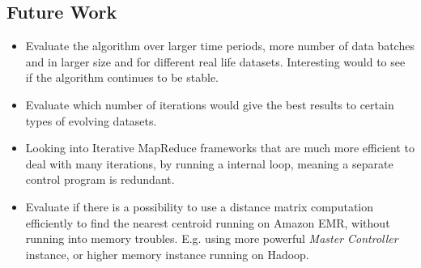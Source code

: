\subsection{Future Work}
\begin{itemize}
	\item Evaluate the algorithm over larger time periods, more number of data batches and in larger size and for different real life datasets. Interesting would to see if the algorithm continues to be stable.
	\item Evaluate which number of iterations would give the best results to certain types of evolving datasets.
	\item Looking into Iterative MapReduce frameworks that are much more efficient to deal with many iterations, by running a internal loop, meaning a separate control program is redundant.
	\item Evaluate if there is a possibility to use a distance matrix computation efficiently to find the nearest centroid running on Amazon EMR, without running into memory troubles. E.g. using more powerful \textit{Master Controller} instance, or higher memory instance running on Hadoop.
\end{itemize}
